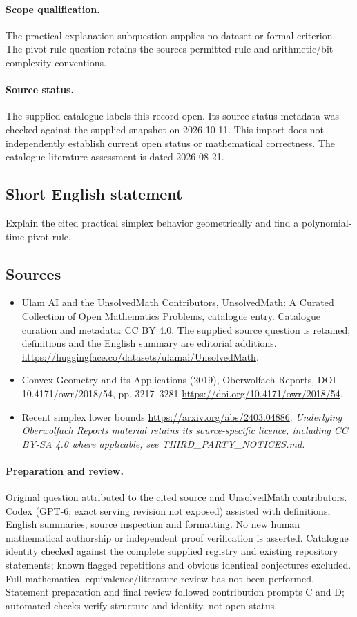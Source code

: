 \documentclass[11pt]{article}
\begin{document}
\paragraph{Scope qualification.}
The practical-explanation subquestion supplies no dataset or formal criterion. The pivot-rule question retains the source\textquotesingle s permitted rule and arithmetic/bit-complexity conventions.
\paragraph{Source status.}
The supplied catalogue labels this record open. Its source-status metadata was checked against the supplied snapshot on 2026-10-11. This import does not independently establish current open status or mathematical correctness. The catalogue literature assessment is dated 2026-08-21.
\subsection{Short English statement}
Explain the cited practical simplex behavior geometrically and find a polynomial-time pivot rule.
\subsection{Sources}
\begin{itemize}
\item[S1] Ulam AI and the UnsolvedMath Contributors, UnsolvedMath: A Curated Collection of Open Mathematics Problems, catalogue entry. Catalogue curation and metadata: CC BY 4.0. The supplied source question is retained; definitions and the English summary are editorial additions.
\url{https://huggingface.co/datasets/ulamai/UnsolvedMath}.
\item[S2] Convex Geometry and its Applications (2019), Oberwolfach Reports, DOI 10.4171/owr/2018/54, pp. 3217--3281
\url{https://doi.org/10.4171/owr/2018/54}.
\item[S3] Recent simplex lower bounds
\url{https://arxiv.org/abs/2403.04886}.
\textit{Underlying Oberwolfach Reports material retains its source-specific licence, including CC BY-SA 4.0 where applicable; see THIRD\_PARTY\_NOTICES.md.}
\end{itemize}
\paragraph{Preparation and review.}
Original question attributed to the cited source and UnsolvedMath contributors. Codex (GPT-6; exact serving revision not exposed) assisted with definitions, English summaries, source inspection and formatting. No new human mathematical authorship or independent proof verification is asserted. Catalogue identity checked against the complete supplied registry and existing repository statements; known flagged repetitions and obvious identical conjectures excluded. Full mathematical-equivalence/literature review has not been performed. Statement preparation and final review followed contribution prompts C and D; automated checks verify structure and identity, not open status.
\label{end:statement}
\end{document}
